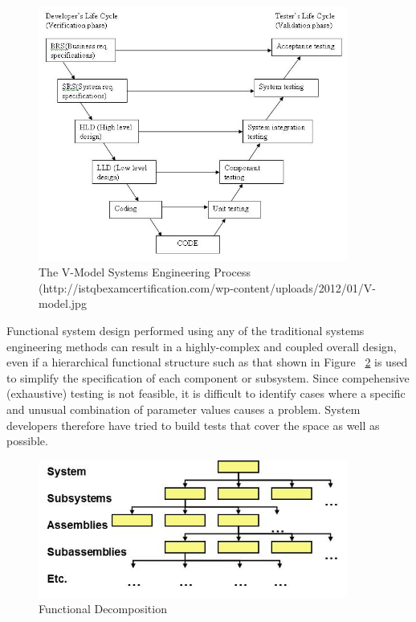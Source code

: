 \begin{figure}[h] 
\centering
   \includegraphics[width=4in]{vmodel2.jpg} 
   \caption{The V-Model Systems Engineering Process (http://istqbexamcertification.com/wp-content/uploads/2012/01/V-model.jpg}
   \label{fig:vmodel}
\end{figure}

Functional system design performed using any of the traditional systems engineering methods
can result in a highly-complex and coupled overall design, 
even if a hierarchical functional structure such as that 
shown in Figure ~\ref{fig:functional-decomposition} is used to simplify the specification 
of each component or subsystem.  Since compehensive (exhaustive) testing is not feasible, 
it is difficult to identify cases where a specific and unusual combination of parameter values 
causes a problem.  System developers therefore have tried to build tests that cover
the space as well as possible.

\begin{figure}[h] 
\centering
   \includegraphics[width=4in]{functional-decomposition.jpg} 
   \caption{Functional Decomposition}
   \label{fig:functional-decomposition}
\end{figure}

